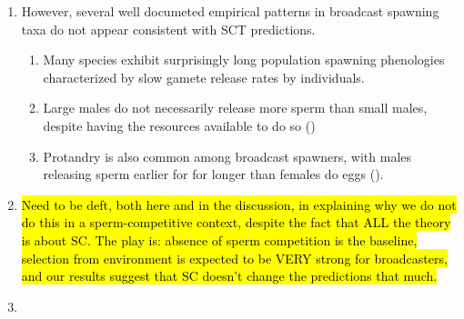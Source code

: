 \documentclass{article}
\begin{document}
\begin{enumerate}
	\item However, several well documeted empirical patterns in broadcast spawning taxa do not appear consistent with SCT predictions.
		\begin{enumerate}
			\item Many species exhibit surprisingly long population spawning phenologies characterized by slow gamete release rates by individuals.
			\item Large males do not necessarily release more sperm than small males, despite having the resources available to do so (\citealt{Styan2003})
			\item Protandry is also common among broadcast spawners, with males releasing sperm earlier for for longer than females do eggs (\citealt{McEuan1988, LotterhosLevitan2011, Levitan2005, MarshallBolton2007}).
		\end{enumerate}

	\item \hl{Need to be deft, both here and in the discussion, in explaining why we do not do this in a sperm-competitive context, despite the fact that ALL the theory is about SC. The play is: absence of sperm competition is the baseline, selection from environment is expected to be VERY strong for broadcasters, and our results suggest that SC doesn't change the predictions that much.}

	\item 


\end{enumerate}
\end{document}
